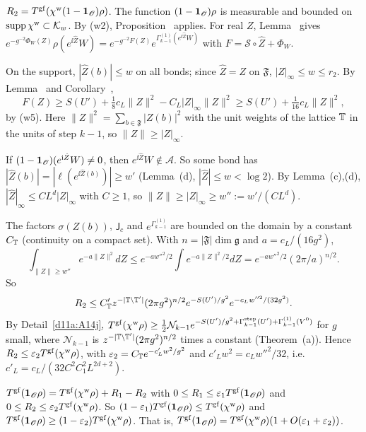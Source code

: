 \begin{detail}\label{d11a:A14i}
\begin{step}
$R_2=T^{\rm gf}(\chi^{\rm w}(1-\mathbf 1_{\mathscr O})\rho)$. The function $(1-\mathbf 1_{\mathscr O})\rho$ is measurable and bounded on $\operatorname{supp}\chi^{\rm w}\subset\mathcal K_w$. By (w2), Proposition~ applies. For real $Z$, Lemma~ gives $e^{-g^{-2}\Phi_W(Z)}\rho(e^{\ii\hat Z}W)=e^{-g^{-2}F(Z)}e^{\Gamma^{(1)}_{k-1}(e^{\ii\hat Z}W)}$ with $F=\mathcal S\circ\hat Z+\Phi_W$.
\end{step}
\begin{step}
On the support, $|\hat Z(b)|\le w$ on all bonds; since $\hat Z=Z$ on $\mathfrak F$, $|Z|_\infty\le w\le r_2$. By Lemma~ and Corollary~,
\[
F(Z)\ge S(U')+\tfrac18c_L\|Z\|^2-C_L|Z|_\infty\|Z\|^2\ge S(U')+\tfrac1{16}c_L\|Z\|^2,
\]
by (w5). Here $\|Z\|^2=\sum_{b\in\mathfrak F}|Z(b)|^2$ with the unit weights of the lattice $\mathbb T$ in the units of step $k-1$, so $\|Z\|\ge|Z|_\infty$.
\end{step}
\begin{step}
If $(1-\mathbf 1_{\mathscr O})(e^{\mathrm i\hat Z}W)\ne0$, then $e^{\ii\hat Z}W\notin\mathscr A$. So some bond has $|\hat Z(b)|=|\ell(e^{\ii\hat Z(b)})|\ge w'$ (Lemma~(d), $|\hat Z|\le w<\log2$). By Lemma~(c),(d), $|\hat Z|_\infty\le CL^d|Z|_\infty$ with $C\ge1$, so $\|Z\|\ge|Z|_\infty\ge w'':=w'/(CL^d)$.
\end{step}
\begin{step}
The factors $\sigma(Z(b))$, $\mathsf J_c$ and $e^{\Gamma^{(1)}_{k-1}}$ are bounded on the domain by a constant $C_\mathbb T$ (continuity on a compact set). With $n=|\mathfrak F|\dim\mathfrak g$ and $a=c_L/(16g^2)$,
\[
\int_{\|Z\|\ge w''}e^{-a\|Z\|^2}dZ\le e^{-aw''^2/2}\int e^{-a\|Z\|^2/2}dZ=e^{-aw''^2/2}(2\pi/a)^{n/2}.
\]
So
\[
R_2\le C'_\mathbb T z^{-|\mathbb T\setminus\mathbb T'|}(2\pi g^2)^{n/2}e^{-S(U')/g^2}e^{-c_Lw''^2/(32g^2)}.
\]
By Detail~\ref{d11a:A14j}, $T^{\rm gf}(\chi^{\rm w}\rho)\ge\frac12\mathcal N_{k-1}e^{-S(U')/g^2+\Gamma^{\rm step}_{k-1}(U')+\Gamma^{(1)}_{k-1}(V^0)}$ for $g$ small, where $\mathcal N_{k-1}$ is $z^{-|\mathbb T\setminus\mathbb T'|}(2\pi g^2)^{n/2}$ times a constant (Theorem~(a)). Hence $R_2\le\varepsilon_2T^{\rm gf}(\chi^{\rm w}\rho)$, with $\varepsilon_2=C_\mathbb T e^{-c'_Lw^2/g^2}$ and $c'_Lw^2=c_Lw''^2/32$, i.e.\ $c'_L=c_L/(32C^2C_1^2L^{2d+2})$.
\end{step}
\begin{step}
$T^{\rm gf}(\mathbf 1_{\mathscr O}\rho)=T^{\rm gf}(\chi^{\rm w}\rho)+R_1-R_2$ with $0\le R_1\le\varepsilon_1T^{\rm gf}(\mathbf 1_{\mathscr O}\rho)$ and $0\le R_2\le\varepsilon_2T^{\rm gf}(\chi^{\rm w}\rho)$. So $(1-\varepsilon_1)T^{\rm gf}(\mathbf 1_{\mathscr O}\rho)\le T^{\rm gf}(\chi^{\rm w}\rho)$ and $T^{\rm gf}(\mathbf 1_{\mathscr O}\rho)\ge(1-\varepsilon_2)T^{\rm gf}(\chi^{\rm w}\rho)$. That is, $T^{\rm gf}(\mathbf 1_{\mathscr O}\rho)=T^{\rm gf}(\chi^{\rm w}\rho)(1+O(\varepsilon_1+\varepsilon_2))$.
\end{step}
\end{detail}

